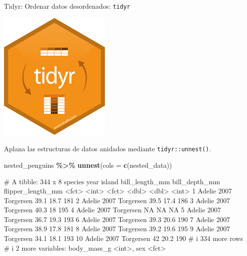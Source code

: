 \documentclass[
  ignorenonframetext,
  aspectratio=169]{beamer}
\newenvironment{Shaded}{\begin{snugshade}}{\end{snugshade}}
\newcommand{\AttributeTok}[1]{\textcolor[rgb]{0.13,0.29,0.53}{#1}}
\newcommand{\FunctionTok}[1]{\textcolor[rgb]{0.13,0.29,0.53}{\textbf{#1}}}
\newcommand{\NormalTok}[1]{#1}
\newcommand{\SpecialCharTok}[1]{\textcolor[rgb]{0.81,0.36,0.00}{\textbf{#1}}}
\let\oldverbatim\verbatim
\let\endoldverbatim\endverbatim
\renewenvironment{verbatim}{\tiny\oldverbatim}{\endoldverbatim}
\begin{document}
\begin{frame}[fragile]{Tidyr: Ordenar datos desordenados:
\texttt{tidyr}}
\label{tidyr-ordenar-datos-desordenados-tidyr-7}
\begin{flushright}\includegraphics[width=0.05\linewidth]{Imgs/logo_tidyr} \end{flushright}

Aplana las estructuras de datos anidados mediante
\texttt{tidyr::unnest()}.

\begin{Shaded}
\begin{Highlighting}[]
\NormalTok{nested\_penguins }\SpecialCharTok{\%\textgreater{}\%} \FunctionTok{unnest}\NormalTok{(}\AttributeTok{cols =} \FunctionTok{c}\NormalTok{(nested\_data)) }
\end{Highlighting}
\end{Shaded}

\begin{verbatim}
# A tibble: 344 x 8
   species  year island    bill_length_mm bill_depth_mm flipper_length_mm
   <fct>   <int> <fct>              <dbl>         <dbl>             <int>
 1 Adelie   2007 Torgersen           39.1          18.7               181
 2 Adelie   2007 Torgersen           39.5          17.4               186
 3 Adelie   2007 Torgersen           40.3          18                 195
 4 Adelie   2007 Torgersen           NA            NA                  NA
 5 Adelie   2007 Torgersen           36.7          19.3               193
 6 Adelie   2007 Torgersen           39.3          20.6               190
 7 Adelie   2007 Torgersen           38.9          17.8               181
 8 Adelie   2007 Torgersen           39.2          19.6               195
 9 Adelie   2007 Torgersen           34.1          18.1               193
10 Adelie   2007 Torgersen           42            20.2               190
# i 334 more rows
# i 2 more variables: body_mass_g <int>, sex <fct>
\end{verbatim}
\end{frame}
\end{document}
